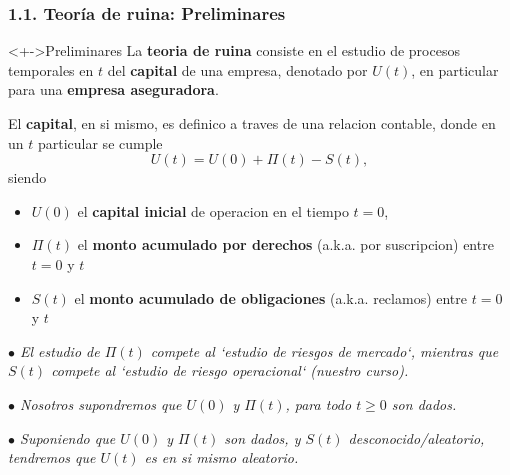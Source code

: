 \documentclass[cjk,t,compress]{beamer}
\begin{document}
\begin{frame}[fragile]
	\frametitle{1.1. Teor\'ia de ruina: Preliminares}
	\scriptsize  	
		
		\vspace{0.1cm}
		\begin{block}<+->{Preliminares}
		\vspace{0.1cm}
		La {\bf teoria de ruina} consiste en el estudio de procesos temporales en $t$ del {\bf capital} de una empresa, denotado por $U(t)$, en particular para una {\bf empresa aseguradora}.

		El {\bf capital}, en si mismo, es definico a traves de una relacion contable, donde en un $t$ particular se cumple
$$
U(t) = U(0) + \Pi(t) - S(t),
$$
siendo 
		\begin{itemize}
		  \item $U(0)$ el {\bf capital inicial} de operacion en el tiempo $t=0$,

		  \item $\Pi(t)$ el {\bf monto acumulado por derechos} (a.k.a. por suscripcion) entre $t=0$ y $t$

		  \item $S(t)$ el {\bf monto acumulado de obligaciones} (a.k.a. reclamos) entre $t=0$ y $t$
		\end{itemize}

	\vfill
	\emph{$\bullet$ El estudio de $\Pi(t)$ compete al `estudio de riesgos de mercado`, mientras que $S(t)$ compete al `estudio de riesgo operacional` (nuestro curso).}

	\vfill
	\emph{$\bullet$ Nosotros supondremos que $U(0)$ y $\Pi(t)$, para todo $t\geq 0$ son dados.}

	\vfill
	\emph{$\bullet$ Suponiendo que $U(0)$ y $\Pi(t)$ son dados, y $S(t)$ desconocido/aleatorio, tendremos que $U(t)$ es en si mismo aleatorio.}
		\end{block}

\end{frame}
\end{document}
